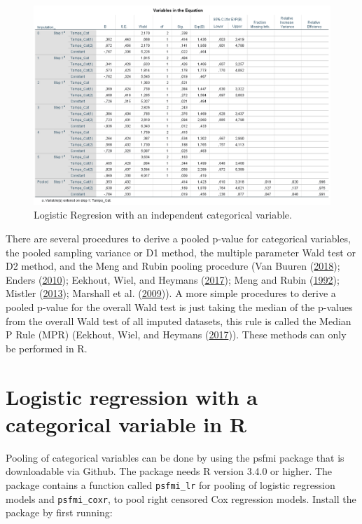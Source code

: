 \documentclass[
]{book}
\begin{document}
\begin{figure}

{\centering \includegraphics[width=0.9\linewidth]{images/fig6.1_logistic} 

}

\caption{Logistic Regresion with an independent categorical variable.}\label{fig:fig6-1}
\end{figure}

There are several procedures to derive a pooled p-value for categorical
variables, the pooled sampling variance or D1 method, the multiple
parameter Wald test or D2 method, and the Meng and Rubin pooling
procedure (Van Buuren (\protect\hyperlink{ref-VanBuuren2018}{2018});
Enders (\protect\hyperlink{ref-enders2010applied}{2010}); Eekhout, Wiel,
and Heymans (\protect\hyperlink{ref-Eekhout2017}{2017}); Meng and Rubin
(\protect\hyperlink{ref-Meng1992}{1992}); Mistler
(\protect\hyperlink{ref-Mistler2013}{2013}); Marshall et al.
(\protect\hyperlink{ref-Marshall2009MedResMeth}{2009})). A more simple
procedures to derive a pooled p-value for the overall Wald test is just
taking the median of the p-values from the overall Wald test of all
imputed datasets, this rule is called the Median P Rule (MPR) (Eekhout,
Wiel, and Heymans (\protect\hyperlink{ref-Eekhout2017}{2017})). These
methods can only be performed in R.

\hypertarget{logistic-regression-with-a-categorical-variable-in-r}{%
\section{Logistic regression with a categorical variable in
R}\label{logistic-regression-with-a-categorical-variable-in-r}}

Pooling of categorical variables can be done by using the psfmi package
that is downloadable via Github. The package needs R version 3.4.0 or
higher. The package contains a function called \texttt{psfmi\_lr} for
pooling of logistic regression models and \texttt{psfmi\_coxr}, to pool
right censored Cox regression models. Install the package by first
running:
\end{document}
